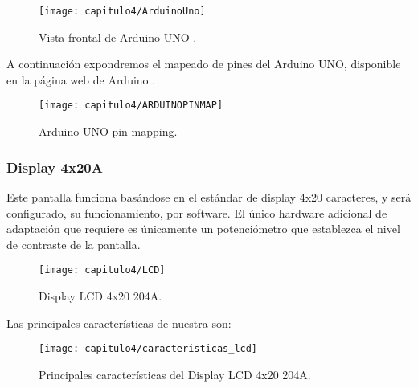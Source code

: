 \smallskip
\begin{figure}[H]%
\noindent \begin{centering}
\texttt{[image: capitulo4/ArduinoUno]}
\par\end{centering}
\caption{\label{fig:ArduinoUno} Vista frontal de Arduino UNO .}
\end{figure}
\smallskip

A continuación expondremos el mapeado de pines del Arduino UNO, disponible en la página web de Arduino \cite{Arduino}.


\smallskip
\begin{figure}[H]%
\noindent \begin{centering}
\texttt{[image: capitulo4/ARDUINOPINMAP]}
\par\end{centering}
\caption{\label{fig:ARDUINOPINMAP} Arduino UNO pin mapping.}
\end{figure}
\smallskip



\subsubsection{Display  4x20A}

Este pantalla  funciona basándose en el estándar de display 4x20 caracteres, y será configurado, su funcionamiento, por software. El único hardware adicional de adaptación que requiere es únicamente un potenciómetro que establezca el nivel de contraste de la pantalla.

\hfill
\begin{figure}[H]%
\noindent \begin{centering}
\texttt{[image: capitulo4/LCD]}
\par\end{centering}
\caption{\label{fig:LCD} Display LCD 4x20 204A.}
\end{figure}
\hfill

Las principales características de nuestra  \cite{LCD} son: 

\smallskip
\begin{figure}[H]%
\noindent \begin{centering}
\texttt{[image: capitulo4/caracteristicas\_lcd]}
\par\end{centering}
\caption{\label{fig:caracteristicas_lcd} Principales características del Display LCD 4x20 204A.}
\end{figure}
\smallskip

